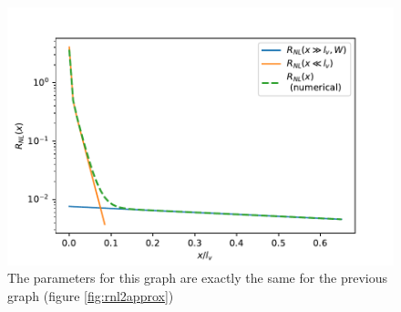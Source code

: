 \begin{figure}[h!]
    \centering
    \includegraphics[width=\linewidth]{Immagini/rnl/x2approx.pdf}
    \caption{The parameters for this graph are exactly the same for the previous graph (figure \ref{fig:rnl2approx})}
    \label{fig:rnlx2approx}
\end{figure}
